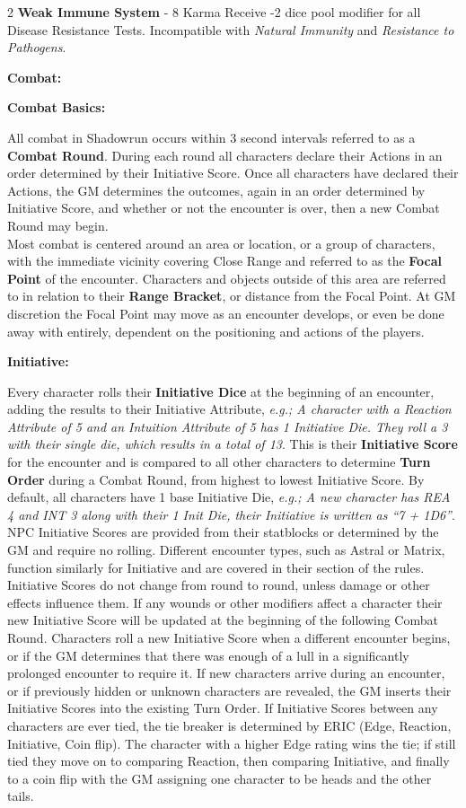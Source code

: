 \documentclass[
  oneside]{article}
\begin{document}
\begin{multicols}{2}
\textbf{Weak Immune System} - 8 Karma Receive -2
dice pool modifier for all Disease Resistance
Tests. Incompatible with \emph{Natural Immunity}
and \emph{Resistance to Pathogens}.

\textbf{Combat:}

\textbf{Combat Basics:}

All combat in Shadowrun occurs within 3 second
intervals referred to as a \textbf{Combat Round}.
During each round all characters declare their
Actions in an order determined by their Initiative
Score. Once all characters have declared their
Actions, the GM determines the outcomes, again in
an order determined by Initiative Score, and
whether or not the encounter is over, then a new
Combat Round may begin.\\
Most combat is centered around an area or
location, or a group of characters, with the
immediate vicinity covering Close Range and
referred to as the \textbf{Focal Point} of the
encounter. Characters and objects outside of this
area are referred to in relation to their
\textbf{Range Bracket}, or distance from the Focal
Point. At GM discretion the Focal Point may move
as an encounter develops, or even be done away
with entirely, dependent on the positioning and
actions of the players.

\textbf{Initiative:}

Every character rolls their \textbf{Initiative
Dice} at the beginning of an encounter, adding the
results to their Initiative Attribute, \emph{e.g.;
A character with a Reaction Attribute of 5 and an
Intuition Attribute of 5 has 1 Initiative Die.
They roll a 3 with their single die, which results
in a total of 13}. This is their
\textbf{Initiative Score} for the encounter and is
compared to all other characters to determine
\textbf{Turn Order} during a Combat Round, from
highest to lowest Initiative Score. By default,
all characters have 1 base Initiative Die,
\emph{e.g.; A new character has REA 4 and INT 3
along with their 1 Init Die, their Initiative is
written as ``7 + 1D6''}. NPC Initiative Scores are
provided from their statblocks or determined by
the GM and require no rolling. Different encounter
types, such as Astral or Matrix, function
similarly for Initiative and are covered in their
section of the rules. Initiative Scores do not
change from round to round, unless damage or other
effects influence them. If any wounds or other
modifiers affect a character their new Initiative
Score will be updated at the beginning of the
following Combat Round. Characters roll a new
Initiative Score when a different encounter
begins, or if the GM determines that there was
enough of a lull in a significantly prolonged
encounter to require it. If new characters arrive
during an encounter, or if previously hidden or
unknown characters are revealed, the GM inserts
their Initiative Scores into the existing Turn
Order. If Initiative Scores between any characters
are ever tied, the tie breaker is determined by
ERIC (Edge, Reaction, Initiative, Coin flip). The
character with a higher Edge rating wins the tie;
if still tied they move on to comparing Reaction,
then comparing Initiative, and finally to a coin
flip with the GM assigning one character to be
heads and the other tails.


\end{multicols}
\end{document}
